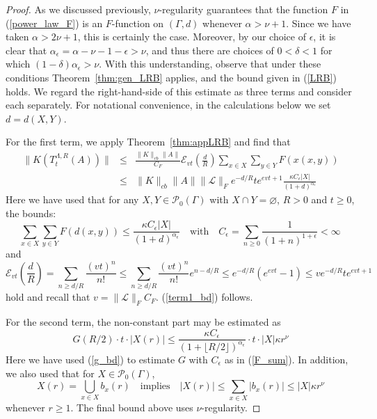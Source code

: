 \documentclass{article}
\newcommand{\E}{\mathscr{E}}
\newcommand{\<}{\langle}
\renewcommand{\>}{\rangle}
\let\emptyset\varnothing
\numberwithin{equation}{section}
\theoremstyle{definition}
\begin{document}
\begin{proof}
As we discussed previously, $\nu$-regularity guarantees that the function $F$ in (\ref{power_law_F}) is an $F$-function on 
$(\Gamma, d)$ whenever $\alpha > \nu +1$.  Since we have taken $\alpha > 2 \nu +1$, this is certainly the case. Moreover, by our choice of 
$\epsilon$, it is clear that $\alpha_{\epsilon} = \alpha - \nu - 1 - \epsilon > \nu$, and thus there are choices of $0< \delta <1$ for which
$(1 - \delta) \alpha_{\epsilon} > \nu$. With this understanding, observe that under these conditions
Theorem~\ref{thm:gen_LRB} applies, and the bound given in (\ref{LRB}) holds. We regard the right-hand-side of this estimate
as three terms and consider each separately. For notational convenience, in the calculations below we set $d=d(X,Y)$.  

For the first term, we apply Theorem~\ref{thm:appLRB} and find that 
\begin{eqnarray} \label{term1_bd}
\| K(T_t^{\Lambda, R}(A)) \| & \leq & \frac{ \| K \|_{cb} \| A \|}{C_F} \E_{vt} \left( \frac{d}{R} \right) \sum_{x \in X} \sum_{y \in Y} F(x(x,y)) \nonumber \\
& \leq &  \| K \|_{cb} \| A \|  \| \mathscr{L} \|_F e^{- d/R} t e^{evt+1} \frac{ \kappa C_{\epsilon} |X|}{(1+d)^{\alpha_\epsilon}}
\end{eqnarray}
Here we have used that for any $X,Y \in \mathcal{P}_0(\Gamma)$ with $X \cap Y = \emptyset$, $R>0$ and $t\geq0$, the bounds:
\begin{equation} \label{F_sum}
\sum_{x \in X} \sum_{y \in Y} F(d(x,y)) \leq \frac{ \kappa C_{\epsilon} |X|}{(1+d)^{\alpha_\epsilon}} \quad \mbox{with} \quad C_{\epsilon} = \sum_{n \geq 0} \frac{1}{(1+ n)^{ 1+ \epsilon}}< \infty \, 
\end{equation}
and 
\begin{equation} \label{E_bd}
\E_{vt} \left( \frac{d}{R} \right) = \sum_{n \geq d/R} \frac{(vt)^n}{n!}  \leq  \sum_{n \geq d/R} \frac{(vt)^n}{n!} e^{n - d/R} 
 \leq  e^{- d/R} \left(e^{evt}-1 \right) \leq v e^{-d/R} te^{evt+1}
\end{equation}
hold and recall that $v = \| \mathscr{L} \|_F C_F$. (\ref{term1_bd}) follows. 

For the second term, the non-constant part may be estimated as
\begin{equation} \label{term2_bd}
G(R/2) \cdot t \cdot |X(r)| \leq \frac{\kappa C_{\epsilon}}{(1+ \lfloor R/2 \rfloor)^{\alpha_\epsilon}} \cdot t \cdot |X| \kappa r^{\nu}
\end{equation}
Here we have used (\ref{g_bd}) to estimate $G$ with $C_{\epsilon}$ as in (\ref{F_sum}). In addition, we also used that for $X \in \mathcal{P}_0(\Gamma)$,
\begin{equation}
X(r) = \bigcup_{x \in X} b_x(r) \quad \mbox{implies} \quad |X(r)| \leq \sum_{x \in X} |b_x(r)| \leq |X| \kappa r^{\nu} 
\end{equation}
whenever $r\geq1$. The final bound above uses $\nu$-regularity. 


\end{proof}
\end{document}
